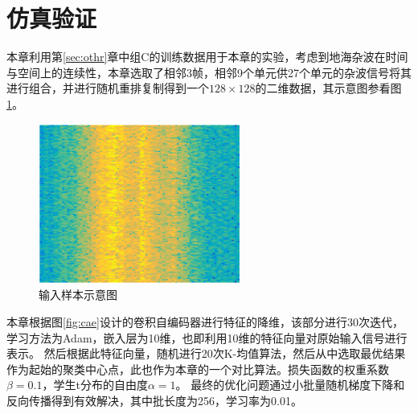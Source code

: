 \section{仿真验证}
\label{sec:decc_experiment}
本章利用第\ref{sec:othr}章中组C的训练数据用于本章的实验，考虑到地海杂波在时间与空间上的连续性，本章选取了相邻3帧，相邻9个单元供27个单元的杂波信号将其进行组合，并进行随机重排复制得到一个$128\times 128$的二维数据，其示意图参看图 \ref{fig:unsurpvised_data}。
\begin{figure}[hbt]
	\centering
	\includegraphics[width=6.67cm]{figures/AE/unsurpvised_data}
	\caption{输入样本示意图}
	\label{fig:unsurpvised_data}
\end{figure}
本章根据图\ref{fig:cae}设计的卷积自编码器进行特征的降维，该部分进行30次迭代，学习方法为Adam，嵌入层为10维，也即利用10维的特征向量对原始输入信号进行表示。
然后根据此特征向量，随机进行20次K-均值算法，然后从中选取最优结果作为起始的聚类中心点，此也作为本章的一个对比算法。损失函数的权重系数$\beta = 0.1$，学生t分布的自由度$\alpha = 1$。
最终的优化问题通过小批量随机梯度下降和反向传播得到有效解决，其中批长度为256，学习率为0.01。

